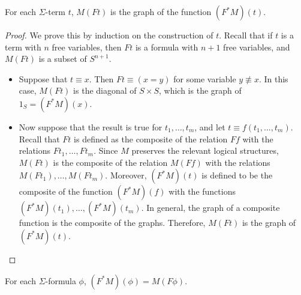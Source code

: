
\begin{lemma} For each $\Sigma$-term $t$, $M(Ft)$ is the graph of the
  function $(F^*M)(t)$.  \end{lemma}

\begin{proof} We prove this by induction on the construction of $t$.
  Recall that if $t$ is a term with $n$ free variables, then $Ft$ is a
  formula with $n+1$ free variables, and $M(Ft)$ is a subset of
  $S^{n+1}$.
  \begin{itemize}
  \item Suppose that $t\equiv x$.  Then $Ft\equiv (x=y)$ for some
    variable $y\not\equiv x$.  In this case, $M(Ft)$ is the diagonal
    of $S\times S$, which is the graph of $1_S=(F^*M)(x)$.
  \item Now suppose that the result is true for $t_1,\dots ,t_m$, and
    let $t\equiv f(t_1,\dots ,t_m)$.  Recall that $Ft$ is defined as
    the composite of the relation $Ff$ with the relations
    $Ft_1,\dots ,Ft_m$.  Since $M$ preserves the relevant logical
    structures, $M(Ft)$ is the composite of the relation $M(Ff)$ with
    the relations $M(Ft_1),\dots ,M(Ft_m)$.  Moreover, $(F^*M)(t)$ is
    defined to be the composite of the function $(F^*M)(f)$ with the
    functions $(F^*M)(t_1),\dots ,(F^*M)(t_m)$.  In general, the graph
    of a composite function is the composite of the graphs.
    Therefore, $M(Ft)$ is the graph of
    $(F^*M)(t)$.  \end{itemize} \end{proof}

\begin{prop} For each $\Sigma$-formula $\phi$,
  $(F^*M)(\phi )=M(F\phi )$.  \end{prop}

